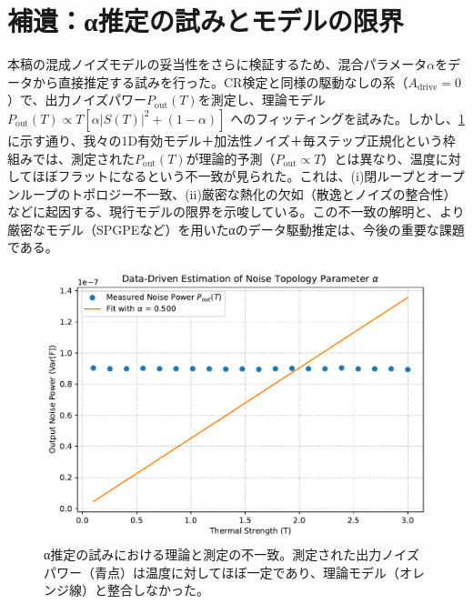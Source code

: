 \documentclass[a4paper,11pt,ja=standard,lualatex]{bxjsarticle}
\newcommand{\figref}[1]{\cref{#1}}
\begin{document}
\section{補遺：α推定の試みとモデルの限界}
\label{sec:appendixE}
本稿の混成ノイズモデルの妥当性をさらに検証するため、混合パラメータ$\alpha$をデータから直接推定する試みを行った。CR検定と同様の駆動なしの系（$A_{\mathrm{drive}}=0$）で、出力ノイズパワー$P_{\mathrm{out}}(T)$を測定し、理論モデル $P_{\mathrm{out}}(T) \propto T [ \alpha |S(T)|^2 + (1-\alpha) ]$ へのフィッティングを試みた。しかし、\figref{fig:alpha_estimation_fail}に示す通り、我々の1D有効モデル＋加法性ノイズ＋毎ステップ正規化という枠組みでは、測定された$P_{\mathrm{out}}(T)$が理論的予測（$P_{\mathrm{out}} \propto T$）とは異なり、温度に対してほぼフラットになるという不一致が見られた。これは、(i)閉ループとオープンループのトポロジー不一致、(ii)厳密な熱化の欠如（散逸とノイズの整合性）などに起因する、現行モデルの限界を示唆している。この不一致の解明と、より厳密なモデル（SPGPEなど）を用いたαのデータ駆動推定は、今後の重要な課題である。

\begin{figure}[H]
\centering
\includegraphics[width=0.8\linewidth]{alpha_estimation_results.pdf}
\caption{α推定の試みにおける理論と測定の不一致。測定された出力ノイズパワー（青点）は温度に対してほぼ一定であり、理論モデル（オレンジ線）と整合しなかった。}
\label{fig:alpha_estimation_fail}
\end{figure}



\end{document}

